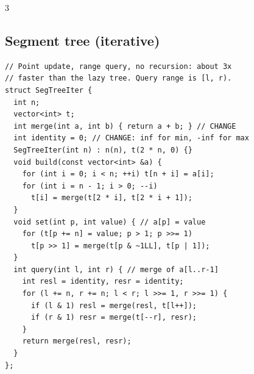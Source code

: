 \documentclass[8pt, a4paper]{article}
\begin{document}
\begin{multicols*}{3}
\subsection{Segment tree (iterative)}
\begin{lstlisting}
// Point update, range query, no recursion: about 3x
// faster than the lazy tree. Query range is [l, r).
struct SegTreeIter {
  int n;
  vector<int> t;
  int merge(int a, int b) { return a + b; } // CHANGE
  int identity = 0; // CHANGE: inf for min, -inf for max
  SegTreeIter(int n) : n(n), t(2 * n, 0) {}
  void build(const vector<int> &a) {
    for (int i = 0; i < n; ++i) t[n + i] = a[i];
    for (int i = n - 1; i > 0; --i)
      t[i] = merge(t[2 * i], t[2 * i + 1]);
  }
  void set(int p, int value) { // a[p] = value
    for (t[p += n] = value; p > 1; p >>= 1)
      t[p >> 1] = merge(t[p & ~1LL], t[p | 1]);
  }
  int query(int l, int r) { // merge of a[l..r-1]
    int resl = identity, resr = identity;
    for (l += n, r += n; l < r; l >>= 1, r >>= 1) {
      if (l & 1) resl = merge(resl, t[l++]);
      if (r & 1) resr = merge(t[--r], resr);
    }
    return merge(resl, resr);
  }
};
\end{lstlisting}

\end{multicols*}
\end{document}
